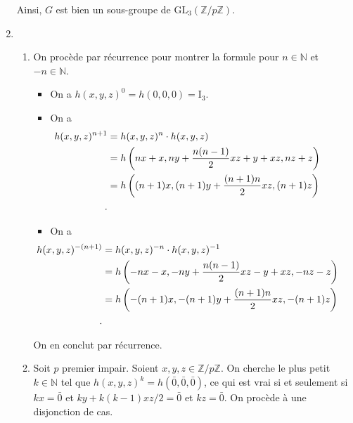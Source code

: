 \documentclass{../../td}
\begin{document}
\begin{enumerate}
      Ainsi, $G$ est bien un sous-groupe de $\mathrm{GL}_3(\mathds{Z} / p \mathds{Z})$.
    \item
      \begin{enumerate}
        \item On procède par récurrence pour montrer la formule pour $n \in \mathds{N}$ et $-n \in \mathds{N}$.
          \begin{itemize}
            \item On a $h(x,y,z)^0 = h(0,0,0) = \mathrm{I}_3$.
            \item On a
              {
                \small
              \begin{align*}
                \hspace{-3em}
                h(x,y,z)^{n+1} &= h(x,y,z)^n \cdot h(x,y,z)\\
                &= h\left(n x + x, ny + \frac{n(n-1)}{2} xz + y + x z, n z + z\right) \\
                &= h\left((n+1)x, (n+1)y + \frac{(n+1)n}{2} xz, (n+1)z\right) \\
              .\end{align*}
              }
            \item On a
              {
                \footnotesize
              \begin{align*}
                \hspace{-3em}
                h(x,y,z)^{-(n+1)} &= h(x,y,z)^{-n} \cdot h(x,y,z)^{-1}\\
                &= h\left(-n x - x, -ny + \frac{n(n-1)}{2} xz - y + x z, -n z - z\right) \\
                &= h\left(-(n+1)x, -(n+1)y + \frac{(n+1)n}{2} xz, -(n+1)z\right) \\
              .\end{align*}
              }
          \end{itemize}
          On en conclut par récurrence.
        \item Soit $p$ premier impair.
          Soient $x,y,z \in \mathds{Z} / p\mathds{Z}$.
          On cherche le plus petit $k \in \mathds{N}$ tel que $h(x,y,z)^k = h(\bar0,\bar0,\bar0)$, ce qui est vrai si et seulement si $k x = \bar{0}$ et $k y + k(k-1) x z / 2 = \bar{0}$ et $k z = \bar{0}$.
          On procède à une disjonction de cas.


\end{enumerate}
\end{enumerate}
\end{document}
